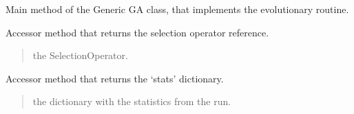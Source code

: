 \documentclass[letterpaper,10pt,english]{sphinxmanual}
\begin{document}
\begin{fulllineitems}
\begin{fulllineitems}
\label{\detokenize{pygenalgo.engines:pygenalgo.engines.generic_ga.GenericGA.run}}
\pysigstartsignatures
{}
\pysigstopsignatures
\sphinxAtStartPar
Main method of the Generic GA class, that implements the evolutionary routine.

\end{fulllineitems}


\begin{fulllineitems}
\label{\detokenize{pygenalgo.engines:pygenalgo.engines.generic_ga.GenericGA.select_op}}
\pysigstartsignatures
{}
\pysigstopsignatures
\sphinxAtStartPar
Accessor method that returns the selection operator reference.
\begin{quote}\begin{description}
\sphinxAtStartPar
the SelectionOperator.

\end{description}\end{quote}

\end{fulllineitems}


\begin{fulllineitems}
\label{\detokenize{pygenalgo.engines:pygenalgo.engines.generic_ga.GenericGA.stats}}
\pysigstartsignatures
{}
\pysigstopsignatures
\sphinxAtStartPar
Accessor method that returns the ‘stats’ dictionary.
\begin{quote}\begin{description}
\sphinxAtStartPar
the dictionary with the statistics from the run.

\end{description}\end{quote}

\end{fulllineitems}


\end{fulllineitems}
\end{document}
